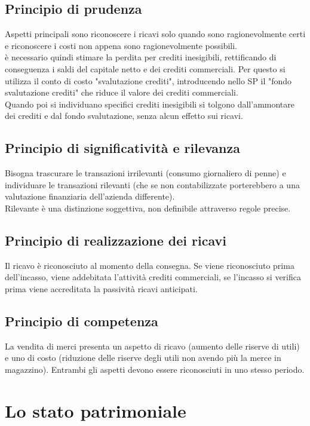 \documentclass{report}
\begin{document}
	\subsection{Principio di prudenza}
	Aspetti principali sono riconoscere i ricavi solo quando sono ragionevolmente certi e riconoscere i costi non appena sono ragionevolmente possibili.\medskip \\è necessario quindi stimare la perdita per crediti inesigibili, rettificando di conseguenza i saldi del capitale netto e dei crediti commerciali. Per questo si utilizza il conto di costo "svalutazione crediti", introducendo nello SP il "fondo svalutazione crediti" che riduce il valore dei crediti commerciali.\medskip \\Quando poi si individuano specifici crediti inesigibili si tolgono dall'ammontare dei crediti e dal fondo svalutazione, senza alcun effetto sui ricavi.
	\subsection{Principio di significatività e rilevanza}
	Bisogna trascurare le transazioni irrilevanti (consumo giornaliero di penne) e individuare le transazioni rilevanti (che se non contabilizzate porterebbero a una valutazione finanziaria dell'azienda differente).\medskip \\Rilevante è una distinzione soggettiva, non definibile attraverso regole precise.
	\subsection{Principio di realizzazione dei ricavi}
	Il ricavo è riconosciuto al momento della consegna. Se viene riconosciuto prima dell'incasso, viene addebitata l'attività crediti commerciali, se l'incasso si verifica prima viene accreditata la passività ricavi anticipati.
	\subsection{Principio di competenza}
	La vendita di merci presenta un aspetto di ricavo (aumento delle riserve di utili) e uno di costo (riduzione delle riserve degli utili non avendo più la merce in magazzino). Entrambi gli aspetti devono essere riconosciuti in uno stesso periodo.
	\section{Lo stato patrimoniale}
\end{document}
